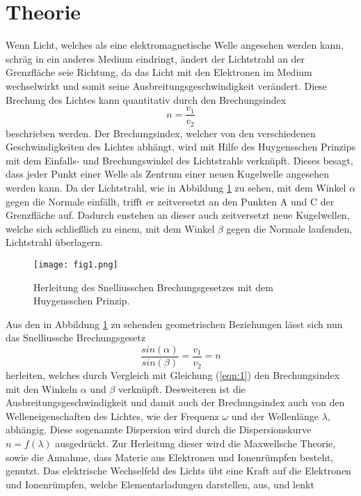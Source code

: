 \section{Theorie}
\label{sec:Theorie}
Wenn Licht, welches als eine elektromagnetische Welle angesehen werden kann, schräg in ein anderes Medium eindringt, ändert der Lichtstrahl an der Grenzfläche
seie Richtung, da das Licht mit den Elektronen im Medium wechselwirkt und somit seine Ausbreitungsgeschwindigkeit verändert. Diese Brechung des Lichtes kann
quantitativ durch den Brechungsindex
\begin{equation}
n=\frac{v_1}{v_2}
\label{eqn:1}
\end{equation}
beschrieben werden. Der Brechungsindex, welcher von den verschiedenen Geschwindigkeiten des Lichtes abhängt, wird mit Hilfe des Huygensschen Prinzips mit dem
Einfalls- und Brechungswinkel des Lichtstrahls verknüpft. Dieses besagt, dass jeder Punkt einer Welle als Zentrum einer neuen Kugelwelle angesehen werden kann.
Da der Lichtstrahl, wie in Abbildung \ref{fig:1} zu sehen, mit dem Winkel $\alpha$ gegen die Normale einfällt, trifft er zeitversetzt an den Punkten A und C
der Grenzfläche auf. Dadurch enstehen an dieser auch zeitversetzt neue Kugelwellen, welche sich schließlich zu einem, mit dem Winkel $\beta$ gegen die Normale
laufenden, Lichtstrahl überlagern.
\begin{figure}
  \centering
  \texttt{[image: fig1.png]}
  \caption{Herleitung des Snelliusschen Brechungsgesetzes mit dem Huygensschen Prinzip. \cite{1}}
  \label{fig:1}
\end{figure}
Aus den in Abbildung \ref{fig:1} zu sehenden geometrischen Beziehungen lässt sich nun das Snelliussche Brechungsgesetz
\begin{equation}
\frac{sin(\alpha)}{sin(\beta)} = \frac{v_1}{v_2} = n
\label{eqn:2}
\end{equation}
herleiten, welches durch Vergleich mit Gleichung (\ref{eqn:1}) den Brechungsindex mit den Winkeln $\alpha$ und $\beta$ verknüpft.
Desweiteren ist die Ausbreitungsgeschwindigkeit und damit auch der Brechungsindex auch von den Welleneigenschaften  des Lichtes, wie der Frequenz $\omega$ und der
Wellenlänge $\lambda$, abhängig.
Diese sogenannte Dispersion wird durch die Dispersionskurve $n=f(\lambda)$ ausgedrückt.
Zur Herleitung dieser wird die Maxwellsche Theorie, sowie die Annahme, dass Materie aus Elektronen und Ionenrümpfen besteht, genutzt.
Das elektrische Wechselfeld des Lichts übt eine Kraft auf die Elektronen und Ionenrümpfen, welche Elementarladungen darstellen, aus, und lenkt

